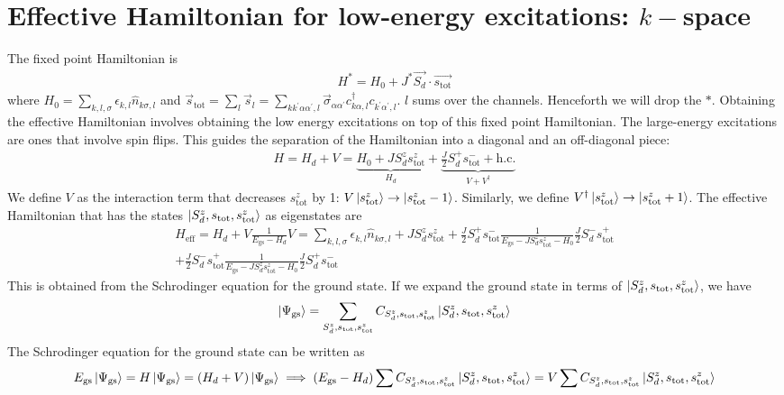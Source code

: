\documentclass[12pt]{revtex4-2}
\begin{document}
\section{Effective Hamiltonian for low-energy excitations: \(k-\)space}
The fixed point Hamiltonian is
\begin{align}
	H^* = H_0 + J^* \vec{S_d}\cdot\vec{s_\text{tot}}
\end{align}
where \(H_0 = \sum_{k,l,\sigma}\epsilon_{k,l}\hat n_{k\sigma,l}\) and \(\vec s_\text{tot} = \sum_l \vec s_l = \sum_{kk^\prime\alpha\alpha^\prime,l} \vec \sigma_{\alpha\alpha^\prime}c^\dagger_{k\alpha,l}c_{k^\prime\alpha^\prime,l}\). \(l\) sums over the channels. Henceforth we will drop the \(*\). Obtaining the effective Hamiltonian involves obtaining the low energy excitations on top of this fixed point Hamiltonian. The large-energy excitations are ones that involve spin flips. This guides the separation of the Hamiltonian into a diagonal and an off-diagonal piece:
\begin{align}
	H = H_d + V = \underbrace{H_0 + J S_d^z s_\text{tot}^z}_{H_d} + \underbrace{\frac{J}{2}S_d^+ s_\text{tot}^- + \text{h.c.}}_{V + V^\dagger}
\end{align}
We define \(V\) as the interaction term that decreases \(s_\text{tot}^z\) by 1: \(V \ket{s_\text{tot}^z} \to \ket{s_\text{tot}^z - 1}\). Similarly, we define \(V^\dagger \ket{s_\text{tot}^z} \to \ket{s_\text{tot}^z + 1}\). The effective Hamiltonian that has the states \(\ket{S_d^z, s_\text{tot}, s_\text{tot}^z}\) as eigenstates are
\begin{align}
	H_\text{eff} = H_d + V \frac{1}{E_\text{gs} - H_d}V = \sum_{k,l,\sigma}\epsilon_{k,l}\hat n_{k\sigma,l} + J S_d^z s_\text{tot}^z + \frac{J}{2}S_d^+ s_\text{tot}^- \frac{1}{E_\text{gs} - J S_d^z s_\text{tot}^z - H_0}\frac{J}{2}S_d^- s_\text{tot}^+\\
	+\frac{J}{2}S_d^- s_\text{tot}^+ \frac{1}{E_\text{gs} - J S_d^z s_\text{tot}^z - H_0}\frac{J}{2}S_d^+ s_\text{tot}^-
\end{align}
This is obtained from the Schrodinger equation for the ground state. If we expand the ground state in terms of \(\ket{S_d^z, s_\text{tot}, s_\text{tot}^z}\), we have 
\begin{align}
	\label{gstate_Expand}
\ket{\Psi_\text{gs}} = \sum_{S_d^z, s_\text{tot},s_\text{tot}^z}C_{S_d^z, s_\text{tot},s_\text{tot}^z}\ket{S_d^z, s_\text{tot}, s_\text{tot}^z}
\end{align}
The Schrodinger equation for the ground state can be written as
\begin{align}
	E_\text{gs}\ket{\Psi_\text{gs}} = H \ket{\Psi_\text{gs}} = \left(H_d + V\right)\ket{\Psi_\text{gs}} \implies \left(E_\text{gs} - H_d\right)\sum C_{S_d^z, s_\text{tot},s_\text{tot}^z}\ket{S_d^z, s_\text{tot}, s_\text{tot}^z} = V\sum C_{S_d^z, s_\text{tot},s_\text{tot}^z}\ket{S_d^z, s_\text{tot}, s_\text{tot}^z}
\end{align}
\end{document}
